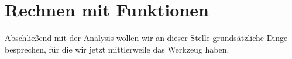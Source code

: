 \section{Rechnen mit Funktionen}
Abschließend mit der Analysis wollen wir an dieser Stelle grundsätzliche Dinge besprechen, für die wir jetzt mittlerweile das Werkzeug haben.





